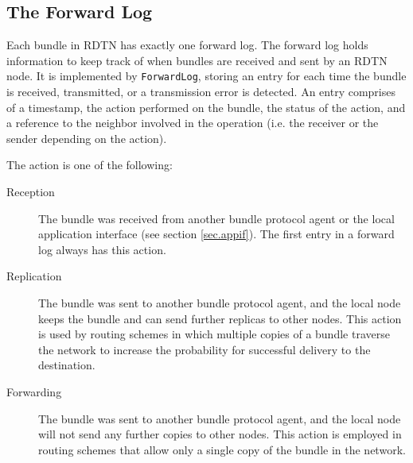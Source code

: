 \documentclass[a4paper]{article}
\begin{document}
\subsection{The Forward Log}\label{sec.forward-log}

Each bundle in RDTN has exactly one forward log. The forward log holds
information to keep track of when bundles are received and sent by an RDTN node.
It is implemented by {\tt ForwardLog}, storing an entry for each time the bundle
is received, transmitted, or a transmission error is detected. An entry
comprises of a timestamp, the action performed on the bundle, the status of the
action, and a reference to the neighbor involved in the operation (i.e. the
receiver or the sender depending on the action).

The action is one of the following:
\begin{description}

\item[Reception] The bundle was received from another bundle protocol agent or
the local application interface (see section \ref{sec.appif}). 
The first entry in a forward log always has this action.

\item[Replication] The bundle was sent to another bundle protocol agent, and the
local node keeps the bundle and can send further replicas to other nodes. This
action is used by routing schemes in which multiple copies of a bundle traverse
the network to increase the probability for successful delivery to the
destination.

\item[Forwarding] The bundle was sent to another bundle protocol agent, and the
local node will not send any further copies to other nodes. This action is
employed in routing schemes that allow only a single copy of the bundle in the
network.

\end{description}
\end{document}
